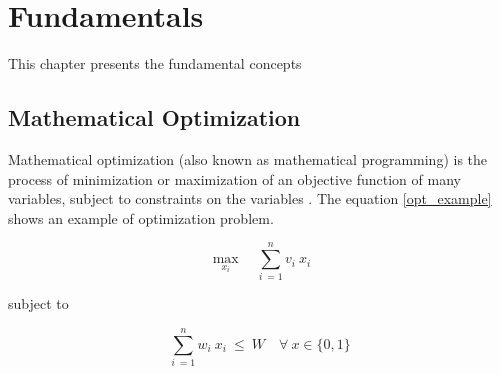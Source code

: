 \chapter{Fundamentals}
This chapter presents the fundamental concepts 


\section{Mathematical Optimization}

\iffalse
However, before introducing the pattern recognition method, Hart describes the NILM problem as a combinatorial optimization (CO) problem, formulated in the following way: let's assume that the measured value (current/power) in the input of the house is $P(t)$ at time $t$. The goal of the algorithm would be to decode $P(t)$ in many components $P_i(t) \ \forall \ i \in 1..n$, where $n$ is the number of power components and each one would be be associated to one specific state $i$. Hence, we have that

$$P(t) = P_1(t) + ... + P_n(t)$$
 
The CO formulation can be written by using the equation \ref{co} for each time reading $t$ 

\begin{equation} \label{co}
    \min_{x} \quad \left|P(t) - \sum_{i=1}^{n} x_i\ P_i \right|
\end{equation}

where $x_i(t)$ is a boolean that describes the state of the power component $i$ at time $t$. As noted in the reference, this problem although mathematically attractive, is a NP-complete “weighted set” problem, hence it has a high computational cost. In addition, it's complexity increases with the addition of more states of devices or measurements.
\fi


Mathematical optimization (also known as mathematical programming) is the process of minimization or maximization of an objective function of many variables, subject to constraints on the variables \cite{ampl}. The equation \eqref{opt_example} shows an example of optimization problem.

\begin{equation} \label{opt_example}
    \max_{x_i} \quad \sum_{i\ = 1}^{n} v_i\ x_i
\end{equation}

subject to 

\begin{equation}
    \sum_{i\ = 1}^{n} w_i\ x_i \ \leq \ W \quad \forall \ x \in \{0,1\}
\end{equation}

